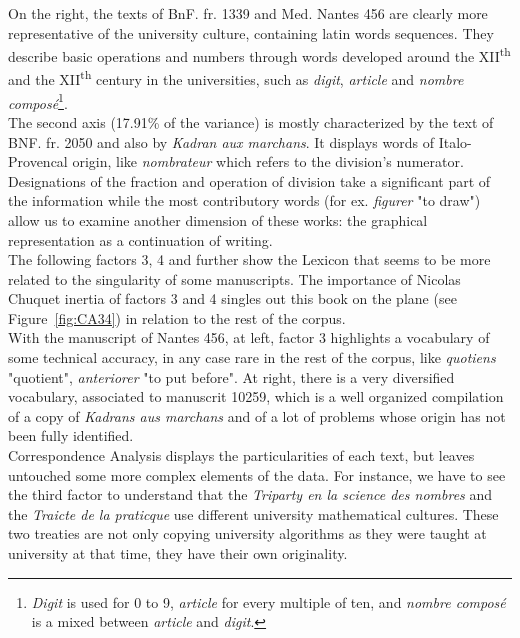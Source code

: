 \documentclass[preprint]{elsarticle}
\begin{document}
On the right, the texts of BnF. fr. 1339 and Med. Nantes 456 are clearly more representative of the university culture, containing latin words sequences. They describe basic operations and numbers through words developed around the XII\textsuperscript{th} and the XII\textsuperscript{th} century in the universities, such as \textit{digit}, \textit{article} and \textit{nombre compos\'e}\footnote{\textit{Digit} is used for 0 to 9, \textit{article} for every multiple of ten, and \textit{nombre compos\'e} is a mixed between \textit{article} and \textit{digit}.}.\\

The second axis (17.91\% of the variance) is mostly characterized by the text of BNF. fr. 2050 and also by \textit{Kadran aux marchans}. It displays words of Italo-Provencal origin, like \textit{nombrateur} which refers to the division's numerator. Designations of the fraction and operation of division take a significant part of the information while the most contributory words (for ex. \textit{figurer} "to draw") allow us to examine another dimension of these works: the graphical representation as a continuation of writing.\\

The following factors 3, 4 and further show the Lexicon that seems to be more related to the singularity of some manuscripts. The importance of Nicolas Chuquet inertia of  factors 3 and 4 singles out this book on the plane (see Figure~\ref{fig:CA34}) in relation to the rest of the corpus.\\

With the manuscript of Nantes 456, at left, factor 3 highlights a vocabulary of some technical accuracy, in any case rare in the rest of the corpus, like \textit{quotiens} "quotient", \textit{anteriorer} "to put before". At right, there is a very diversified vocabulary, associated to manuscrit 10259, which is a well organized compilation of a copy of \textit{Kadrans aus marchans} and of a lot of problems whose origin has not been fully identified.\\ 

Correspondence Analysis displays the particularities of each text, but leaves untouched some more complex elements of the data. For instance, we have to see the third factor to understand that the  \textit{Triparty en la science des nombres} and the \textit{Traicte de la praticque} use different university mathematical cultures. These two treaties are not only copying university algorithms as they were taught at university at that time, they have their own originality.\\
\end{document}
